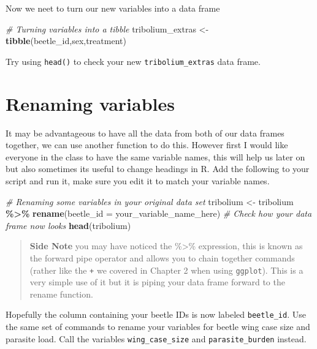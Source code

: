 \documentclass[
]{book}
\newenvironment{Shaded}{\begin{snugshade}}{\end{snugshade}}
\newcommand{\AttributeTok}[1]{\textcolor[rgb]{0.13,0.29,0.53}{#1}}
\newcommand{\CommentTok}[1]{\textcolor[rgb]{0.56,0.35,0.01}{\textit{#1}}}
\newcommand{\FunctionTok}[1]{\textcolor[rgb]{0.13,0.29,0.53}{\textbf{#1}}}
\newcommand{\NormalTok}[1]{#1}
\newcommand{\OtherTok}[1]{\textcolor[rgb]{0.56,0.35,0.01}{#1}}
\newcommand{\SpecialCharTok}[1]{\textcolor[rgb]{0.81,0.36,0.00}{\textbf{#1}}}
\begin{document}
Now we neet to turn our new variables into a data frame

\begin{Shaded}
\begin{Highlighting}[]
\CommentTok{\# Turning variables into a tibble}
\NormalTok{tribolium\_extras }\OtherTok{\textless{}{-}} \FunctionTok{tibble}\NormalTok{(beetle\_id,sex,treatment)}
\end{Highlighting}
\end{Shaded}

Try using \texttt{head()} to check your new \texttt{tribolium\_extras} data frame.

\hypertarget{renaming}{%
\section{Renaming variables}\label{renaming}}

It may be advantageous to have all the data from both of our data frames together, we can use another function to do this. However first I would like everyone in the class to have the same variable names, this will help us later on but also sometimes its useful to change headings in R. Add the following to your script and run it, make sure you edit it to match your variable names.

\begin{Shaded}
\begin{Highlighting}[]
\CommentTok{\# Renaming some variables in your original data set}
\NormalTok{tribolium }\OtherTok{\textless{}{-}}\NormalTok{ tribolium }\SpecialCharTok{\%\textgreater{}\%}
  \FunctionTok{rename}\NormalTok{(}\AttributeTok{beetle\_id =}\NormalTok{ your\_variable\_name\_here)}
\CommentTok{\# Check how your data frame now looks}
\FunctionTok{head}\NormalTok{(tribolium) }
\end{Highlighting}
\end{Shaded}

\begin{quote}
\textbf{Side Note} you may have noticed the \%\textgreater\% expression, this is known as the forward pipe operator and allows you to chain together commands (rather like the \texttt{+} we covered in Chapter 2 when using \texttt{ggplot}). This is a very simple use of it but it is piping your data frame forward to the rename function.
\end{quote}

Hopefully the column containing your beetle IDs is now labeled \texttt{beetle\_id}. Use the same set of commands to rename your variables for beetle wing case size and parasite load. Call the variables \texttt{wing\_case\_size} and \texttt{parasite\_burden} instead.
\end{document}
